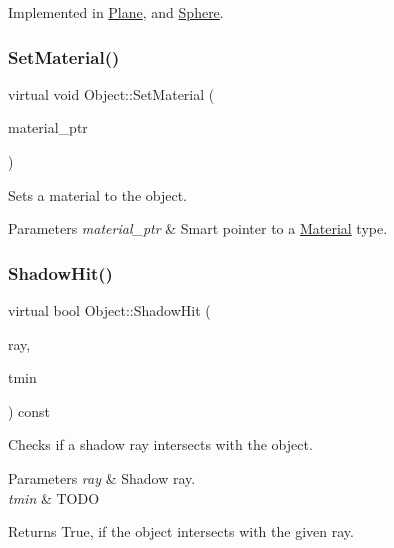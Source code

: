 Implemented in \hyperlink{class_plane_a71712655452a8ecbfe5907197e980c1e}{Plane}, and \hyperlink{class_sphere_ab568d3aa3eccdd0c691150fc3d5bb86f}{Sphere}.

\hypertarget{class_object_a791d7431f79b030866aa31c7c29ea0db}{}\label{class_object_a791d7431f79b030866aa31c7c29ea0db} 
\subsubsection{\texorpdfstring{Set\+Material()}{SetMaterial()}}
{\footnotesize\ttfamily virtual void Object\+::\+Set\+Material (\begin{DoxyParamCaption}\item[{std\+::shared\+\_\+ptr$<$ \hyperlink{class_material}{Material} $>$}]{material\+\_\+ptr }\end{DoxyParamCaption})\hspace{0.3cm}{\ttfamily [virtual]}}

Sets a material to the object. 
\begin{DoxyParams}{Parameters}
{\em material\+\_\+ptr} & Smart pointer to a \hyperlink{class_material}{Material} type. \\
\hline
\end{DoxyParams}
\hypertarget{class_object_a020a6edbef7b2591b1dd6815ebbc5aa0}{}\label{class_object_a020a6edbef7b2591b1dd6815ebbc5aa0} 
\subsubsection{\texorpdfstring{Shadow\+Hit()}{ShadowHit()}}
{\footnotesize\ttfamily virtual bool Object\+::\+Shadow\+Hit (\begin{DoxyParamCaption}\item[{const \hyperlink{class_ray}{Ray} \&}]{ray,  }\item[{float \&}]{tmin }\end{DoxyParamCaption}) const\hspace{0.3cm}{\ttfamily [pure virtual]}}

Checks if a shadow ray intersects with the object. 
\begin{DoxyParams}{Parameters}
{\em ray} & Shadow ray. \\
\hline
{\em tmin} & T\+O\+DO \\
\hline
\end{DoxyParams}
\begin{DoxyReturn}{Returns}
True, if the object intersects with the given ray. 
\end{DoxyReturn}


